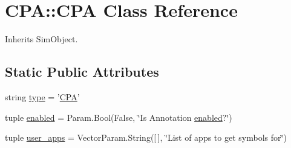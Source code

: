 \hypertarget{classCPA_1_1CPA}{
\section{CPA::CPA Class Reference}
\label{classCPA_1_1CPA}
}


Inherits SimObject.

\subsection*{Static Public Attributes}
\begin{DoxyCompactItemize}
\item 
string \hyperlink{classCPA_1_1CPA_acdfeaa8a4e65e395f0625cbb0003d6d9}{type} = '\hyperlink{classCPA_1_1CPA}{CPA}'
\item 
tuple \hyperlink{classCPA_1_1CPA_aa51fc369b2c6374a7e8528ebcefebad8}{enabled} = Param.Bool(False, \char`\"{}Is Annotation \hyperlink{classCPA_1_1CPA_aa51fc369b2c6374a7e8528ebcefebad8}{enabled}?\char`\"{})
\item 
tuple \hyperlink{classCPA_1_1CPA_a81ba328a54b3af6462493b928a9656f5}{user\_\-apps} = VectorParam.String(\mbox{[}$\,$\mbox{]}, \char`\"{}List of apps to get symbols for\char`\"{})
\end{DoxyCompactItemize}


